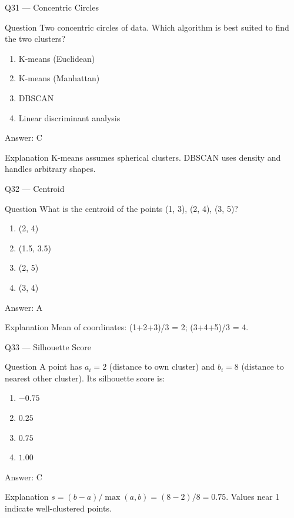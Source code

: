 \documentclass[aspectratio=169,8pt]{beamer}
\begin{document}
	\begin{frame}{Q31 --- Concentric Circles}
		\begin{block}{Question}
			Two concentric circles of data. Which algorithm is best suited to find the two clusters?
		\end{block}
		\begin{enumerate}
			\item K-means (Euclidean)
			\item K-means (Manhattan)
			\item DBSCAN
			\item Linear discriminant analysis
		\end{enumerate}
		\begin{exampleblock}{Answer: C}\end{exampleblock}
		\begin{block}{Explanation}
			K-means assumes spherical clusters. DBSCAN uses density and handles arbitrary shapes.
		\end{block}
	\end{frame}
	
	\begin{frame}{Q32 --- Centroid}
		\begin{block}{Question}
			What is the centroid of the points (1, 3), (2, 4), (3, 5)?
		\end{block}
		\begin{enumerate}
			\item (2, 4)
			\item (1.5, 3.5)
			\item (2, 5)
			\item (3, 4)
		\end{enumerate}
		\begin{exampleblock}{Answer: A}\end{exampleblock}
		\begin{block}{Explanation}
			Mean of coordinates: (1+2+3)/3 = 2; (3+4+5)/3 = 4.
		\end{block}
	\end{frame}
	
	\begin{frame}{Q33 --- Silhouette Score}
		\begin{block}{Question}
			A point has $a_i = 2$ (distance to own cluster) and $b_i = 8$ (distance to nearest other cluster). Its silhouette score is:
		\end{block}
		\begin{enumerate}
			\item $-0.75$
			\item $0.25$
			\item $0.75$
			\item $1.00$
		\end{enumerate}
		\begin{exampleblock}{Answer: C}\end{exampleblock}
		\begin{block}{Explanation}
			$s=(b-a)/\max(a,b)=(8-2)/8=0.75$. Values near 1 indicate well-clustered points.
		\end{block}
	\end{frame}
	
\end{document}
